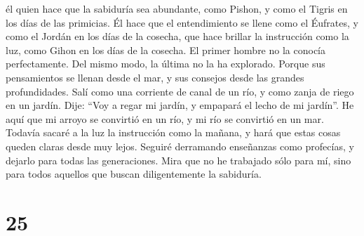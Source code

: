 él quien hace que la sabiduría sea abundante, como Pishon, y como el
Tigris en los días de las primicias.  Él hace que el
entendimiento se llene como el Éufrates, y como el Jordán en los días de
la cosecha,  que hace brillar la instrucción como la luz,
como Gihon en los días de la cosecha.  El primer hombre
no la conocía perfectamente. Del mismo modo, la última no la ha
explorado.  Porque sus pensamientos se llenan desde el
mar, y sus consejos desde las grandes profundidades. 
Salí como una corriente de canal de un río, y como zanja de riego en un
jardín.  Dije: ``Voy a regar mi jardín, y empapará el
lecho de mi jardín''. He aquí que mi arroyo se convirtió en un río, y mi
río se convirtió en un mar.  Todavía sacaré a la luz la
instrucción como la mañana, y hará que estas cosas queden claras desde
muy lejos.  Seguiré derramando enseñanzas como profecías,
y dejarlo para todas las generaciones.  Mira que no he
trabajado sólo para mí, sino para todos aquellos que buscan
diligentemente la sabiduría.

\hypertarget{section-24}{%
\section{25}\label{section-24}}

